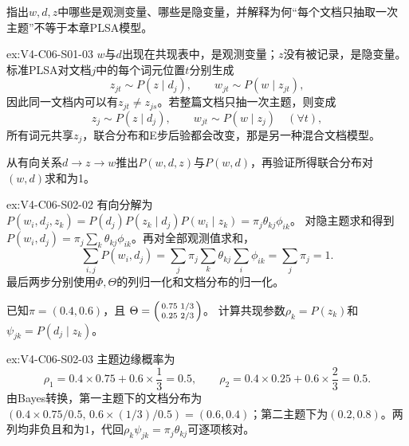 \begin{SLChapterExercisePairSection}
\begin{exercise}\label{ex:V4-C06-S01-03}
指出$w,d,z$中哪些是观测变量、哪些是隐变量，并解释为何“每个文档只抽取一次主题”不等于本章PLSA模型。
\end{exercise}
\ifSLFullEdition
{}\label{sol:V4-C06-S01-03}
\begin{chapterexercisesolution}{ex:V4-C06-S01-03}
$w$与$d$出现在共现表中，是观测变量；$z$没有被记录，是隐变量。标准PLSA对文档$j$中的每个词元位置$t$分别生成
\[
z_{jt}\sim P(z\mid d_j),
\qquad
w_{jt}\sim P(w\mid z_{jt}),
\]
因此同一文档内可以有$z_{jt}\ne z_{js}$。若整篇文档只抽一次主题，则变成
\[
z_j\sim P(z\mid d_j),
\qquad
w_{jt}\sim P(w\mid z_j)\quad(\forall t),
\]
所有词元共享$z_j$，联合分布和E步后验都会改变，那是另一种混合文档模型。
\end{chapterexercisesolution}
\fi

\begin{exercise}\label{ex:V4-C06-S02-02}
从有向关系$d\to z\to w$推出$P(w,d,z)$与$P(w,d)$，再验证所得联合分布对$(w,d)$求和为1。
\end{exercise}
\ifSLFullEdition
{}\label{sol:V4-C06-S02-02}
\begin{chapterexercisesolution}{ex:V4-C06-S02-02}
有向分解为
$P(w_i,d_j,z_k)=P(d_j)P(z_k\mid d_j)P(w_i\mid z_k)=\pi_j\theta_{kj}\phi_{ik}$。
对隐主题求和得到
$P(w_i,d_j)=\pi_j\sum_k\theta_{kj}\phi_{ik}$。再对全部观测值求和，
\[
\sum_{i,j}P(w_i,d_j)
=\sum_j\pi_j\sum_k\theta_{kj}\sum_i\phi_{ik}
=\sum_j\pi_j=1.
\]
最后两步分别使用$\Phi,\Theta$的列归一化和文档分布的归一化。
\end{chapterexercisesolution}
\fi

\begin{exercise}\label{ex:V4-C06-S02-03}
已知$\pi=(0.4,0.6)$，且
$\Theta=\begin{psmallmatrix}0.75&1/3\\0.25&2/3\end{psmallmatrix}$。
计算共现参数$\rho_k=P(z_k)$和$\psi_{jk}=P(d_j\mid z_k)$。
\end{exercise}
\ifSLFullEdition
{}\label{sol:V4-C06-S02-03}
\begin{chapterexercisesolution}{ex:V4-C06-S02-03}
主题边缘概率为
\[
\rho_1=0.4\times0.75+0.6\times\frac13=0.5,
\qquad
\rho_2=0.4\times0.25+0.6\times\frac23=0.5.
\]
由Bayes转换，第一主题下的文档分布为$(0.4\times0.75/0.5,\,0.6\times(1/3)/0.5)=(0.6,0.4)$；第二主题下为$(0.2,0.8)$。两列均非负且和为1，代回$\rho_k\psi_{jk}=\pi_j\theta_{kj}$可逐项核对。
\end{chapterexercisesolution}
\fi


\end{SLChapterExercisePairSection}
